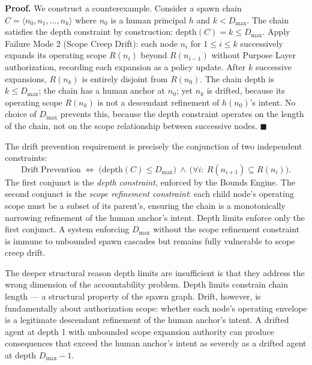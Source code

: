 \medskip
\noindent\textbf{Proof.} We construct a counterexample. Consider a spawn chain $C = \langle n_0, n_1, \ldots, n_k \rangle$ where $n_0$ is a human principal $h$ and $k < D_{\max}$. The chain satisfies the depth constraint by construction: $\mathrm{depth}(C) = k \leq D_{\max}$. Apply Failure Mode 2 (Scope Creep Drift): each node $n_i$ for $1 \leq i \leq k$ successively expands its operating scope $R(n_i)$ beyond $R(n_{i-1})$ without Purpose Layer authorization, recording each expansion as a policy update. After $k$ successive expansions, $R(n_k)$ is entirely disjoint from $R(n_0)$. The chain depth is $k \leq D_{\max}$; the chain has a human anchor at $n_0$; yet $n_k$ is drifted, because its operating scope $R(n_k)$ is not a descendant refinement of $h(n_0)$'s intent. No choice of $D_{\max}$ prevents this, because the depth constraint operates on the length of the chain, not on the scope relationship between successive nodes. $\blacksquare$

The drift prevention requirement is precisely the conjunction of two independent constraints:
\begin{equation}
\mathrm{Drift\ Prevention} \;\iff\; \bigl( \mathrm{depth}(C) \leq D_{\max} \bigr)\ \land\ \bigl( \forall i:\ R(n_{i+1}) \subseteq R(n_i) \bigr).
\label{eq:drift-prevention-constraint}
\end{equation}
The first conjunct is the \emph{depth constraint}, enforced by the Bounds Engine. The second conjunct is the \emph{scope refinement constraint}: each child node's operating scope must be a subset of its parent's, ensuring the chain is a monotonically narrowing refinement of the human anchor's intent. Depth limits enforce only the first conjunct. A system enforcing $D_{\max}$ without the scope refinement constraint is immune to unbounded spawn cascades but remains fully vulnerable to scope creep drift.

The deeper structural reason depth limits are insufficient is that they address the wrong dimension of the accountability problem. Depth limits constrain chain length — a structural property of the spawn graph. Drift, however, is fundamentally about authorization scope: whether each node's operating envelope is a legitimate descendant refinement of the human anchor's intent. A drifted agent at depth 1 with unbounded scope expansion authority can produce consequences that exceed the human anchor's intent as severely as a drifted agent at depth $D_{\max} - 1$.

